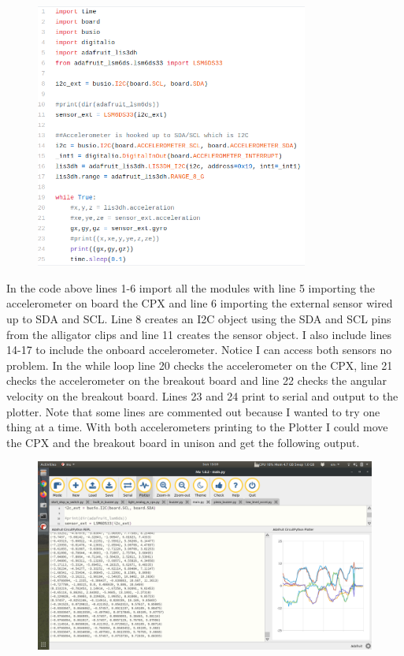 \begin{figure}[H]
  \begin{center}
    \includegraphics[width=0.8\textwidth]{Figures/imu_code.png}
  \end{center}
\end{figure}
In the code above lines 1-6 import all the modules with line 5 importing the accelerometer on board the CPX and line 6 importing the external sensor wired up to SDA and SCL. Line 8 creates an I2C object using the SDA and SCL pins from the alligator clips and line 11 creates the sensor object. I also include lines 14-17 to include the onboard accelerometer. Notice I can access both sensors no problem. In the while loop line 20 checks the accelerometer on the CPX, line 21 checks the accelerometer on the breakout board and line 22 checks the angular velocity on the breakout board. Lines 23 and 24 print to serial and output to the plotter. Note that some lines are commented out because I wanted to try one thing at a time. With both accelerometers printing to the Plotter I could move the CPX and the breakout board in unison and get the following output.
\begin{figure}[H]
  \begin{center}
    \includegraphics[width=\textwidth]{Figures/imu_mu.png}
  \end{center}
\end{figure}
